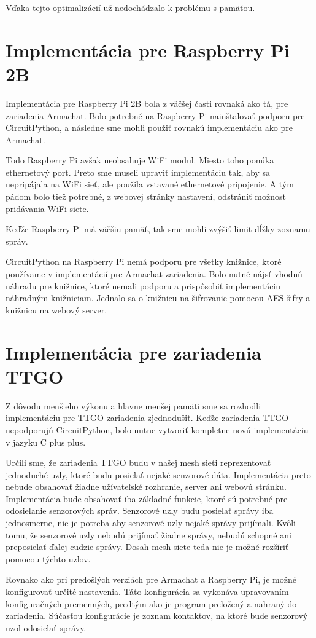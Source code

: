 \documentclass[slovak,master]{diploma}
\begin{document}
Vďaka tejto optimalizácií už nedochádzalo k problému s pamäťou.

\section{Implementácia pre Raspberry Pi 2B}
Implementácia pre Raspberry Pi 2B bola z väčšej časti rovnaká ako tá, pre zariadenia Armachat. Bolo potrebné na Raspberry Pi nainštalovať podporu pre 
CircuitPython, a následne sme mohli použiť rovnakú implementáciu ako pre Armachat.

Todo Raspberry Pi avšak neobsahuje WiFi modul. Miesto toho ponúka ethernetový port. Preto sme museli upraviť implementáciu tak, 
aby sa nepripájala na WiFi sieť, ale použila vstavané ethernetové pripojenie. A tým pádom bolo tiež potrebné, z webovej stránky nastavení, odstrániť možnosť 
pridávania WiFi siete.

Keďže Raspberry Pi má väčšiu pamäť, tak sme mohli zvýšiť limit dĺžky zoznamu správ.

CircuitPython na Raspberry Pi nemá podporu pre všetky knižnice, ktoré používame v implementácií pre Armachat zariadenia. Bolo nutné nájsť vhodnú náhradu pre 
knižnice, ktoré nemali podporu a prispôsobiť implementáciu náhradným knižniciam. Jednalo sa o knižnicu na šifrovanie pomocou AES šifry a knižnicu na webový server. 

\section{Implementácia pre zariadenia TTGO}
Z dôvodu menšieho výkonu a hlavne menšej pamäti sme sa rozhodli implementáciu pre TTGO zariadenia zjednodušiť. Keďže zariadenia TTGO nepodporujú 
CircuitPython, bolo nutne vytvoriť kompletne novú implementáciu v jazyku C plus plus.

Určili sme, že zariadenia TTGO budu v našej mesh sieti reprezentovať jednoduché uzly, ktoré budu posielať nejaké senzorové dáta. Implementácia preto 
nebude obsahovať žiadne užívateľské rozhranie, server ani webovú stránku. Implementácia bude obsahovať iba základné funkcie, ktoré sú potrebné pre 
odosielanie senzorových správ. Senzorové uzly budu posielať správy iba jednosmerne, nie je potreba aby senzorové uzly nejaké správy prijímali. 
Kvôli tomu, že senzorové uzly nebudú prijímať žiadne správy, nebudú schopné ani preposielať ďalej cudzie správy. Dosah mesh siete teda nie je možné 
rozšíriť pomocou týchto uzlov.

Rovnako ako pri predošlých verziách pre Armachat a Raspberry Pi, je možné konfigurovať určité nastavenia. Táto konfigurácia sa vykonáva upravovaním konfiguračných 
premenných, predtým ako je program preložený a nahraný do zariadenia. Súčasťou konfigurácie je zoznam kontaktov, na ktoré bude senzorový uzol odosielať správy.
\end{document}
